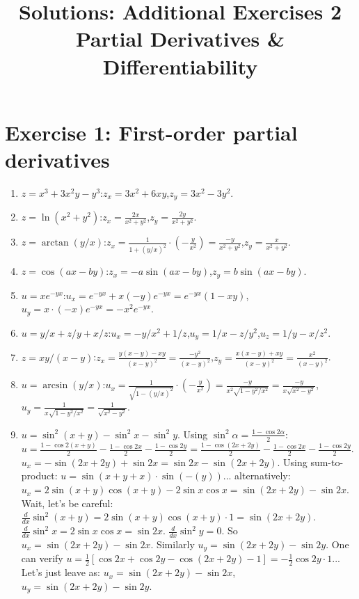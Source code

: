\documentclass[12pt,a4paper]{article}
\title{\textbf{Solutions: Additional Exercises 2}\\
\large Partial Derivatives \& Differentiability}
\date{}
\begin{document}
\maketitle
\thispagestyle{empty}

\section*{Exercise 1: First-order partial derivatives}

\begin{enumerate}[leftmargin=*, label=(\alph*)]

\item $z=x^3+3x^2y-y^3$:\quad $z_x=3x^2+6xy$,\quad $z_y=3x^2-3y^2$.

\item $z=\ln(x^2+y^2)$:\quad $z_x=\frac{2x}{x^2+y^2}$,\quad $z_y=\frac{2y}{x^2+y^2}$.

\item $z=\arctan(y/x)$:\quad $z_x=\frac{1}{1+(y/x)^2}\cdot\left(-\frac{y}{x^2}\right)=\frac{-y}{x^2+y^2}$,\quad $z_y=\frac{x}{x^2+y^2}$.

\item $z=\cos(ax-by)$:\quad $z_x=-a\sin(ax-by)$,\quad $z_y=b\sin(ax-by)$.

\item $u=xe^{-yx}$:\quad $u_x=e^{-yx}+x(-y)e^{-yx}=e^{-yx}(1-xy)$,\quad $u_y=x\cdot(-x)e^{-yx}=-x^2 e^{-yx}$.

\item $u=y/x+z/y+x/z$:\quad $u_x=-y/x^2+1/z$,\quad $u_y=1/x-z/y^2$,\quad $u_z=1/y-x/z^2$.

\item $z=xy/(x-y)$:\quad $z_x=\frac{y(x-y)-xy}{(x-y)^2}=\frac{-y^2}{(x-y)^2}$,\quad $z_y=\frac{x(x-y)+xy}{(x-y)^2}=\frac{x^2}{(x-y)^2}$.

\item $u=\arcsin(y/x)$:\quad $u_x=\frac{1}{\sqrt{1-(y/x)^2}}\cdot\left(-\frac{y}{x^2}\right)=\frac{-y}{x^2\sqrt{1-y^2/x^2}}=\frac{-y}{x\sqrt{x^2-y^2}}$,
$u_y=\frac{1}{x\sqrt{1-y^2/x^2}}=\frac{1}{\sqrt{x^2-y^2}}$.

\item $u=\sin^2(x+y)-\sin^2 x-\sin^2 y$. Using $\sin^2\alpha=\frac{1-\cos 2\alpha}{2}$:
$u=\frac{1-\cos 2(x+y)}{2}-\frac{1-\cos 2x}{2}-\frac{1-\cos 2y}{2}=\frac{1-\cos(2x+2y)}{2}-\frac{1-\cos 2x}{2}-\frac{1-\cos 2y}{2}$.
$u_x=-\sin(2x+2y)+\sin 2x=\sin 2x-\sin(2x+2y)$.
Using sum-to-product: $u=\sin(x+y+x)\cdot\sin(-(y))$... alternatively:
$u_x=2\sin(x+y)\cos(x+y)-2\sin x\cos x=\sin(2x+2y)-\sin 2x$.
Wait, let's be careful: $\frac{d}{dx}\sin^2(x+y)=2\sin(x+y)\cos(x+y)\cdot 1=\sin(2x+2y)$.
$\frac{d}{dx}\sin^2 x=2\sin x\cos x=\sin 2x$. $\frac{d}{dx}\sin^2 y=0$.
So $u_x=\sin(2x+2y)-\sin 2x$.
Similarly $u_y=\sin(2x+2y)-\sin 2y$.
One can verify $u=\frac{1}{2}[\cos 2x+\cos 2y-\cos(2x+2y)-1]=-\frac{1}{2}\cos 2y\cdot 1$... Let's just leave as: $u_x=\sin(2x+2y)-\sin 2x$, $u_y=\sin(2x+2y)-\sin 2y$.


\end{enumerate}
\end{document}
